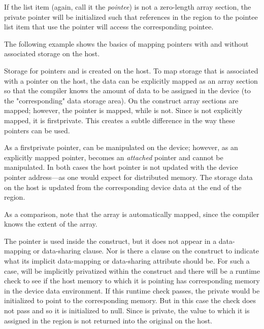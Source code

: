If the list item (again, call it the \emph{pointee}) is not a zero-length array section, the private pointer will be initialized such that references in the  region to the pointee list item that use the pointer will access the corresponding pointee.

The following example shows the basics of mapping pointers with and without
associated storage on the host.

Storage for pointers  and  is created on the host. 
To map storage that is associated with a pointer on the host, the data can be
explicitly mapped as an array section so that the compiler knows 
the amount of data to be assigned in the device (to the "corresponding" data storage area).
On the  construct array sections are mapped; however, the pointer 
is mapped, while  is not. Since  is not explicitly mapped, it is
firstprivate.  This creates a subtle difference in the way these pointers can be used.

As a firstprivate pointer,  can be manipulated on the device;
however, as an explicitly mapped pointer, 
 becomes an \emph{attached} pointer and cannot be manipulated.
In both cases the host pointer is not updated with the device pointer 
address---as one would expect for distributed memory. 
The storage data on the host is updated from the corresponding device
data at the end of the  region.

As a comparison, note that the  array is automatically mapped, 
since the compiler knows the extent of the array. 

The pointer  is used inside the  construct, but it does
not appear in a data-mapping or data-sharing clause. Nor is there a
 clause on the construct to indicate what its implicit
data-mapping or data-sharing attribute should be. For such a case, 
will be implicitly privatized within the construct and there will be a runtime
check to see if the host memory to which it is pointing has corresponding memory
in the device data environment. If this runtime check passes, the private
 would be initialized to point to the corresponding memory. But in
this case the check does not pass and so it is initialized to null.
Since  is private, the value to which it is assigned in the
 region is not returned into the original  on the host.


